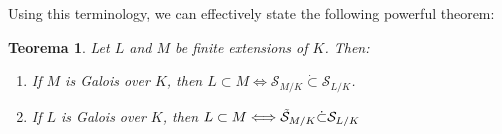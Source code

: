 \documentclass{article}
\theoremstyle{plain}
\newtheorem{thm}{Teorema}
\theoremstyle{definition}
\theoremstyle{remark}
\numberwithin{equation}{section}
\numberwithin{thm}{section}
\begin{document}
Using this terminology, we can effectively state the following powerful theorem:

\begin{thm} \label{8.4}
Let $L$ and $M$ be finite extensions of $K$. Then:

\begin{enumerate}

    \item If $M$ is Galois over $K$, then $L \subset M \Longleftrightarrow \mathcal{S}_{M/K} \dot{\subset} \mathcal{S}_{L/K}$.

    \item If $L$ is Galois over $K$, then $L \subset M \Longleftrightarrow \Tilde{\mathcal{S}}_{M/K} \dot{\subset} \mathcal{S}_{L/K}$
    
\end{enumerate}

\end{thm}
\end{document}
